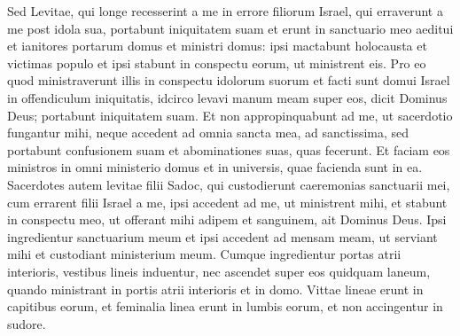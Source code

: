 \begin{biblechapter}
\begin{biblechapter}
\begin{biblechapter}
\begin{biblechapter}
\begin{biblechapter}
\begin{biblechapter}
\begin{biblechapter}
\begin{biblechapter}
\begin{biblechapter}
\begin{biblechapter}
\begin{biblechapter}
\begin{biblechapter}
\begin{biblechapter}
\begin{biblechapter}
\begin{biblechapter}
\begin{biblechapter}
\begin{biblechapter}
\begin{biblechapter}
\begin{biblechapter}
\begin{biblechapter}
\begin{biblechapter}
\begin{biblechapter}
\begin{biblechapter}
\begin{biblechapter}
\begin{biblechapter}
\begin{biblechapter}
\begin{biblechapter}
\begin{biblechapter}
\begin{biblechapter}
\begin{biblechapter}
\begin{biblechapter}
\begin{biblechapter}
\begin{biblechapter}
\begin{biblechapter}
\begin{biblechapter}
\begin{biblechapter}
\begin{biblechapter}
\begin{biblechapter}
\begin{biblechapter}
\begin{biblechapter}
\begin{biblechapter}
\begin{biblechapter}
\begin{biblechapter}
\begin{biblechapter}
 \verse Sed Levitae, qui longe recesserint a me in errore filiorum Israel, qui erraverunt a me post idola sua, portabunt iniquitatem suam 
\verse et erunt in sanctuario meo aeditui et ianitores portarum domus et ministri domus: ipsi mactabunt holocausta et victimas populo et ipsi stabunt in conspectu eorum, ut ministrent eis. 
\verse Pro eo quod ministraverunt illis in conspectu idolorum suorum et facti sunt domui Israel in offendiculum iniquitatis, idcirco levavi manum meam super eos, dicit Dominus Deus; portabunt iniquitatem suam. 
\verse Et non appropinquabunt ad me, ut sacerdotio fungantur mihi, neque accedent ad omnia sancta mea, ad sanctissima, sed portabunt confusionem suam et abominationes suas, quas fecerunt. 
\verse Et faciam eos ministros in omni ministerio domus et in universis, quae facienda sunt in ea.
 \verse Sacerdotes autem levitae filii Sadoc, qui custodierunt caeremonias sanctuarii mei, cum errarent filii Israel a me, ipsi accedent ad me, ut ministrent mihi, et stabunt in conspectu meo, ut offerant mihi adipem et sanguinem, ait Dominus Deus. 
\verse Ipsi ingredientur sanctuarium meum et ipsi accedent ad mensam meam, ut serviant mihi et custodiant ministerium meum. 
\verse Cumque ingredientur portas atrii interioris, vestibus lineis induentur, nec ascendet super eos quidquam laneum, quando ministrant in portis atrii interioris et in domo. 
\verse Vittae lineae erunt in capitibus eorum, et feminalia linea erunt in lumbis eorum, et non accingentur in sudore. 

\end{biblechapter}
\end{biblechapter}
\end{biblechapter}
\end{biblechapter}
\end{biblechapter}
\end{biblechapter}
\end{biblechapter}
\end{biblechapter}
\end{biblechapter}
\end{biblechapter}
\end{biblechapter}
\end{biblechapter}
\end{biblechapter}
\end{biblechapter}
\end{biblechapter}
\end{biblechapter}
\end{biblechapter}
\end{biblechapter}
\end{biblechapter}
\end{biblechapter}
\end{biblechapter}
\end{biblechapter}
\end{biblechapter}
\end{biblechapter}
\end{biblechapter}
\end{biblechapter}
\end{biblechapter}
\end{biblechapter}
\end{biblechapter}
\end{biblechapter}
\end{biblechapter}
\end{biblechapter}
\end{biblechapter}
\end{biblechapter}
\end{biblechapter}
\end{biblechapter}
\end{biblechapter}
\end{biblechapter}
\end{biblechapter}
\end{biblechapter}
\end{biblechapter}
\end{biblechapter}
\end{biblechapter}
\end{biblechapter}

